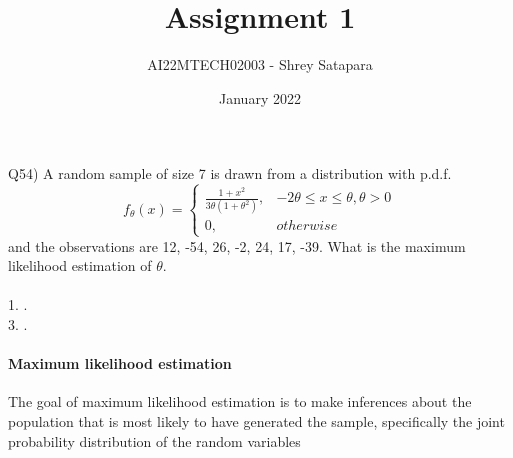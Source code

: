 \documentclass{article}
\title{Assignment 1}
\author{AI22MTECH02003 - Shrey Satapara}
\date{January 2022}
\begin{document}
\maketitle

\paragraph{}
Q54) A random sample of size 7 is drawn from a distribution with p.d.f. \\ 
\[
    f_\theta(x)= 
\begin{cases}
\frac{1 + x^2}{3\theta(1+\theta^2)},& -2\theta \leq x \leq \theta, \theta > 0\\
    0,              & otherwise
\end{cases}
\]
and the observations are 12, -54, 26, -2, 24, 17, -39. What is the maximum likelihood estimation of \(\theta\).
\\\\
1. \quad \quad \quad {}. \\ 3. \quad \quad \quad {}.


\paragraph{Maximum likelihood estimation}The goal of maximum likelihood estimation is to make inferences about the population that is most likely to have generated the sample, specifically the joint probability distribution of the random variables 
\end{document}
